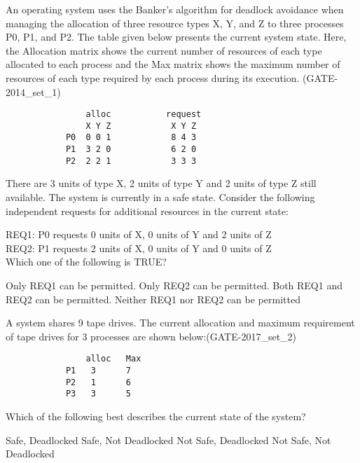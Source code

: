 \begin{questyle}

  \question  An operating system uses the Banker’s algorithm for deadlock avoidance when managing the allocation of
             three resource types X, Y, and Z to three processes P0, P1, and P2. The table given below presents the
             current system state. Here, the Allocation matrix shows the current number of resources of each type
             allocated to each process and the Max matrix shows the maximum number of resources of each type required
             by each process during its execution. (GATE-2014\_set\_1)

             \begin{lstlisting}
                alloc           request
                X Y Z            X Y Z
            P0  0 0 1            8 4 3
            P1  3 2 0            6 2 0
            P2  2 2 1            3 3 3
            \end{lstlisting}


             There are 3 units of type X, 2 units of type Y and 2 units of type Z still available. The system is
             currently in a safe state. Consider the following independent requests for additional resources in the current state:

             REQ1: P0 requests 0 units of X, 0 units of Y and 2 units of Z \\
             REQ2: P1 requests 2 units of X, 0 units of Y and 0 units of Z \\
             Which one of the following is TRUE?
  \begin{choices}
    \choice  Only REQ1 can be permitted.
    \choice  Only REQ2 can be permitted.
    \choice  Both REQ1 and REQ2 can be permitted.
    \choice  Neither REQ1 nor REQ2 can be permitted
  \end{choices}

  \end{questyle}




\begin{questyle}

  \question   A system shares 9 tape drives. The current allocation and maximum requirement of tape drives for 3 processes are shown below:(GATE-2017\_set\_2)

  \begin{lstlisting}
                alloc   Max
            P1   3      7
            P2   1      6
            P3   3      5
            \end{lstlisting}

  Which of the following best describes the current state of the system?
  \begin{choices}
    \choice Safe, Deadlocked
    \choice Safe, Not Deadlocked
    \choice Not Safe, Deadlocked
    \choice Not Safe, Not Deadlocked
  \end{choices}

  \end{questyle}



